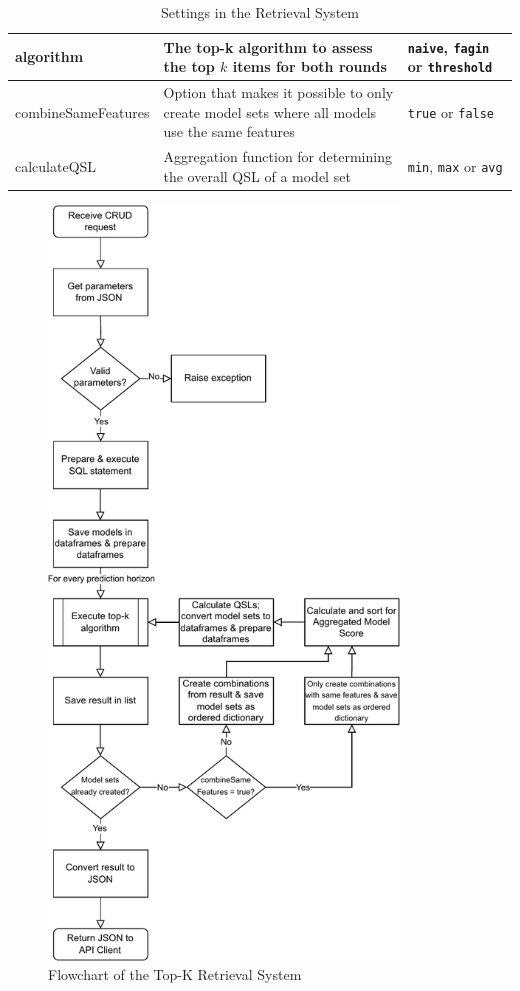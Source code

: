 \begin{table}[htbp]
\begin{tabular}{  l  p{7cm}  p{3cm} }
  algorithm & The top-k algorithm to assess the top $k$ items for both rounds & \texttt{naive}, \texttt{fagin} or \texttt{threshold} \\\hline
  combineSameFeatures & Option that makes it possible to only create model sets where all models use the same features & \texttt{true} or \texttt{false} \\\hline
  calculateQSL & Aggregation function for determining the overall QSL of a model set & \texttt{min}, \texttt{max} or \texttt{avg} \\
          \bottomrule
      \end{tabular}
  \caption{Settings in the Retrieval System} \label{tab:settings}
  \end{table}

  \begin{figure}[htbp]
    \centering
  \includegraphics[height=20cm]{graphics/flowchartretrieval.pdf}
    \caption{Flowchart of the Top-K Retrieval System}
    \label{fig:flowchartretrieval}
  \end{figure}
  

